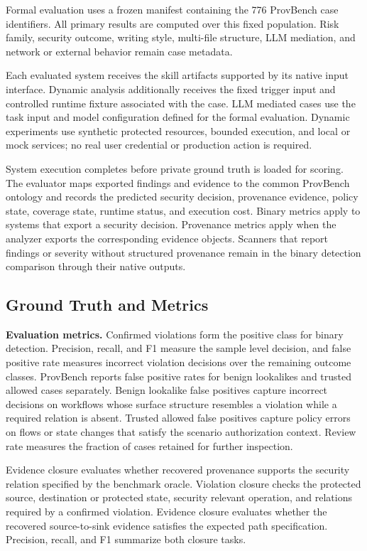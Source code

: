 Formal evaluation uses a frozen manifest containing the 776 ProvBench case
identifiers. All primary results are computed over this fixed population. Risk
family, security outcome, writing style, multi-file structure, LLM mediation,
and network or external behavior remain case metadata.

Each evaluated system receives the skill artifacts supported by its native
input interface. Dynamic analysis additionally receives the fixed trigger
input and controlled runtime fixture associated with the case. LLM mediated
cases use the task input and model configuration defined for the formal
evaluation. Dynamic experiments use synthetic protected resources, bounded
execution, and local or mock services; no real user credential or production
action is required.

System execution completes before private ground truth is loaded for scoring.
The evaluator maps exported findings and evidence to the common ProvBench
ontology and records the predicted security decision, provenance evidence,
policy state, coverage state, runtime status, and execution cost. Binary
metrics apply to systems that export a security decision. Provenance metrics
apply when the analyzer exports the corresponding evidence objects. Scanners
that report findings or severity without structured provenance remain in the
binary detection comparison through their native outputs.


\subsection{Ground Truth and Metrics}
\label{sec:benchmark-metrics}

\textbf{Evaluation metrics.}
Confirmed violations form the positive class for binary detection. Precision,
recall, and F1 measure the sample level decision, and false positive rate
measures incorrect violation decisions over the remaining outcome classes.
ProvBench reports false positive rates for benign lookalikes and trusted
allowed cases separately. Benign lookalike false positives capture incorrect
decisions on workflows whose surface structure resembles a violation while a
required relation is absent. Trusted allowed false positives capture policy
errors on flows or state changes that satisfy the scenario authorization
context. Review rate measures the fraction of cases retained for further
inspection.

Evidence closure evaluates whether recovered provenance supports the security
relation specified by the benchmark oracle. Violation closure checks the
protected source, destination or protected state, security relevant operation,
and relations required by a confirmed violation. Evidence closure evaluates
whether the recovered source-to-sink evidence satisfies the expected path
specification. Precision, recall, and F1 summarize both closure tasks.

